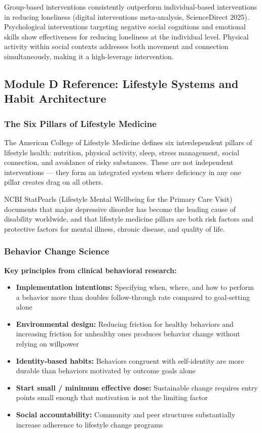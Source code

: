 \documentclass[11pt,letterpaper]{article}
\begin{document}
Group-based interventions consistently outperform individual-based interventions in reducing loneliness (digital interventions meta-analysis, ScienceDirect 2025). Psychological interventions targeting negative social cognitions and emotional skills show effectiveness for reducing loneliness at the individual level. Physical activity within social contexts addresses both movement and connection simultaneously, making it a high-leverage intervention.

\subsection{Module D Reference: Lifestyle Systems and Habit Architecture}

\subsubsection{The Six Pillars of Lifestyle Medicine}

The American College of Lifestyle Medicine defines six interdependent pillars of lifestyle health: nutrition, physical activity, sleep, stress management, social connection, and avoidance of risky substances. These are not independent interventions --- they form an integrated system where deficiency in any one pillar creates drag on all others.

NCBI StatPearls (Lifestyle Mental Wellbeing for the Primary Care Visit) documents that major depressive disorder has become the leading cause of disability worldwide, and that lifestyle medicine pillars are both risk factors and protective factors for mental illness, chronic disease, and quality of life.

\subsubsection{Behavior Change Science}

\textbf{Key principles from clinical behavioral research:}
\begin{itemize}[leftmargin=1.5em]
  \item \textbf{Implementation intentions:} Specifying when, where, and how to perform a behavior more than doubles follow-through rate compared to goal-setting alone
  \item \textbf{Environmental design:} Reducing friction for healthy behaviors and increasing friction for unhealthy ones produces behavior change without relying on willpower
  \item \textbf{Identity-based habits:} Behaviors congruent with self-identity are more durable than behaviors motivated by outcome goals alone
  \item \textbf{Start small / minimum effective dose:} Sustainable change requires entry points small enough that motivation is not the limiting factor
  \item \textbf{Social accountability:} Community and peer structures substantially increase adherence to lifestyle change programs
\end{itemize}
\end{document}
